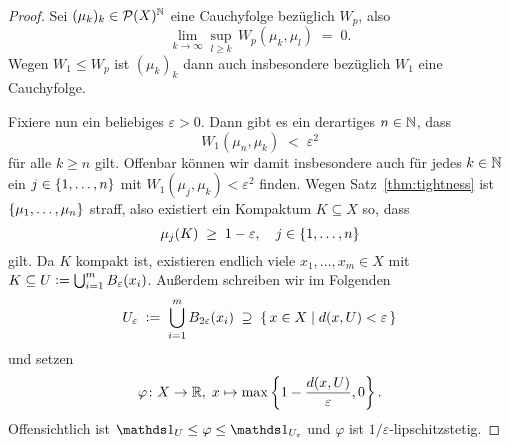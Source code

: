\documentclass[../main/main.tex]{subfiles}
\begin{document}
	\begin{proof}
		Sei $(\mu_k)_k \in \mathcal{P}(X)^{\mathbb{N}}$ eine Cauchyfolge bezüglich $W_p$, also
		\[ \lim_{k \to \infty} \sup_{l \geq k} \, W_p(\mu_k, \mu_l) \; = \; 0 \text{.} \]
		Wegen $W_1 \leq W_p$ ist $(\mu_k)_k$ dann auch insbesondere bezüglich $W_1$ eine Cauchyfolge. 
		
		Fixiere nun ein beliebiges $\varepsilon > 0$. Dann gibt es ein derartiges $n \in \mathbb{N}$, dass 
		\[ W_1(\mu_n, \mu_k) \; < \; \varepsilon^2 \]
		für alle $k \geq n$ gilt. Offenbar können wir damit insbesondere auch für jedes $k \in \mathbb{N}$ ein $j \in \left\{1, \dots, n\right\}$ mit
		$W_1(\mu_j, \mu_k) < \varepsilon^2$ finden. Wegen Satz~\ref{thm:tightness} ist $\left\{\mu_1, \dots, \mu_n\right\}$ straff, also existiert ein Kompaktum
		$K \subseteq X$ so, dass
		\[ \mu_j(K) \; \geq \; 1 - \varepsilon, \quad j \in \left\{1, \dots, n\right\} \]
		gilt. Da $K$ kompakt ist, existieren endlich viele $x_1, \dots, x_m \in X$ mit 
		$K \subseteq U \vcentcolon = \bigcup_{i=1}^{m} B_{\varepsilon}(x_i)$.
		Außerdem schreiben wir im Folgenden 
		\[ U_{\varepsilon} \; \vcentcolon = \; \bigcup_{i=1}^{m} B_{2\varepsilon}(x_i) \; \supseteq \; \left\{\, x \in X \; \middle| \; d(x, U) < \varepsilon \,\right\} \] 
		und setzen 
		\[ \varphi \colon X \to \mathbb{R}, \; x \mapsto \max \left\{1-\frac{d(x, U)}{\varepsilon}, 0 \right\}  \text{.} \]
		Offensichtlich ist $\indfct_U \leq \varphi \leq \indfct_{U_\varepsilon}$ und $\varphi$ ist $1/\varepsilon$-lipschitzstetig.
		

\end{proof}
\end{document}
